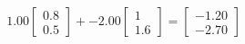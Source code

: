 \documentclass[preview]{standalone}
\begin{document}
\begin{align*}
1.00 \begin{bmatrix} 0.8 \\ 0.5 \end{bmatrix} + -2.00 \begin{bmatrix} 1 \\ 1.6 \end{bmatrix} = \begin{bmatrix} -1.20 \\ -2.70 \end{bmatrix}
\end{align*}
\end{document}
